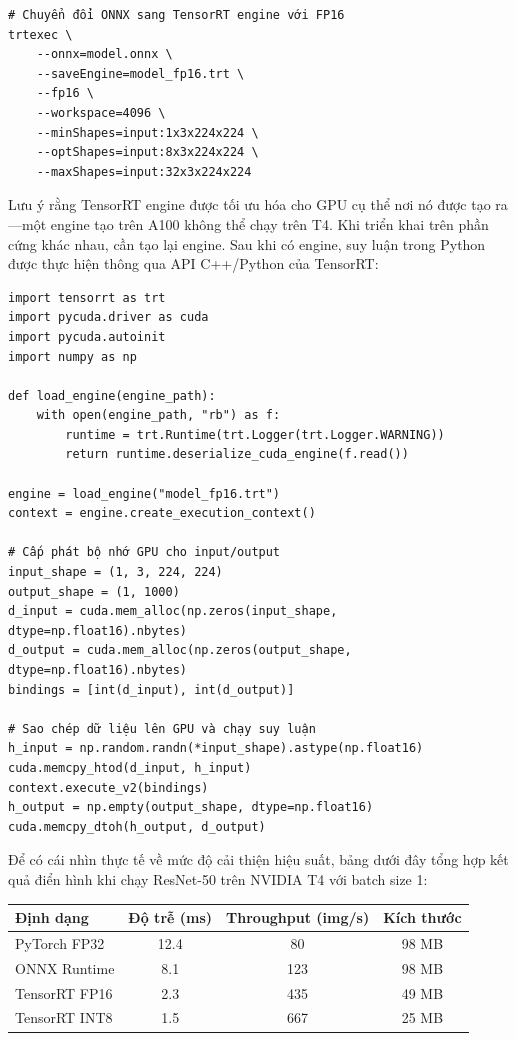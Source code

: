 \begin{verbatim}
# Chuyển đổi ONNX sang TensorRT engine với FP16
trtexec \
    --onnx=model.onnx \
    --saveEngine=model_fp16.trt \
    --fp16 \
    --workspace=4096 \
    --minShapes=input:1x3x224x224 \
    --optShapes=input:8x3x224x224 \
    --maxShapes=input:32x3x224x224
\end{verbatim}

Lưu ý rằng TensorRT engine được tối ưu hóa cho GPU cụ thể nơi nó được tạo ra---một engine tạo trên A100 không thể chạy trên T4. Khi triển khai trên phần cứng khác nhau, cần tạo lại engine. Sau khi có engine, suy luận trong Python được thực hiện thông qua API C++/Python của TensorRT:

\begin{verbatim}
import tensorrt as trt
import pycuda.driver as cuda
import pycuda.autoinit
import numpy as np

def load_engine(engine_path):
    with open(engine_path, "rb") as f:
        runtime = trt.Runtime(trt.Logger(trt.Logger.WARNING))
        return runtime.deserialize_cuda_engine(f.read())

engine = load_engine("model_fp16.trt")
context = engine.create_execution_context()

# Cấp phát bộ nhớ GPU cho input/output
input_shape = (1, 3, 224, 224)
output_shape = (1, 1000)
d_input = cuda.mem_alloc(np.zeros(input_shape, dtype=np.float16).nbytes)
d_output = cuda.mem_alloc(np.zeros(output_shape, dtype=np.float16).nbytes)
bindings = [int(d_input), int(d_output)]

# Sao chép dữ liệu lên GPU và chạy suy luận
h_input = np.random.randn(*input_shape).astype(np.float16)
cuda.memcpy_htod(d_input, h_input)
context.execute_v2(bindings)
h_output = np.empty(output_shape, dtype=np.float16)
cuda.memcpy_dtoh(h_output, d_output)
\end{verbatim}

Để có cái nhìn thực tế về mức độ cải thiện hiệu suất, bảng dưới đây tổng hợp kết quả điển hình khi chạy ResNet-50 trên NVIDIA T4 với batch size 1:

\begin{center}
\begin{tabular}{lccc}
\hline
\textbf{Định dạng} & \textbf{Độ trễ (ms)} & \textbf{Throughput (img/s)} & \textbf{Kích thước} \\
\hline
PyTorch FP32     & 12.4 & 80   & 98 MB  \\
ONNX Runtime     & 8.1  & 123  & 98 MB  \\
TensorRT FP16    & 2.3  & 435  & 49 MB  \\
TensorRT INT8    & 1.5  & 667  & 25 MB  \\
\hline
\end{tabular}
\end{center}

